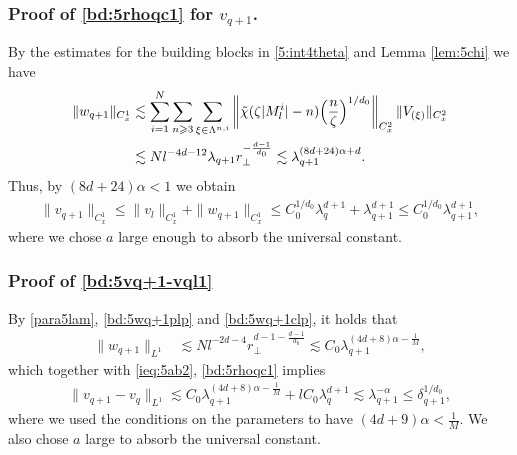 \documentclass[UTF-8,reqno]{amsart}
\numberwithin{equation}{section}
\theoremstyle{definition}
\def\({{\Big(}}
\def\){{\Big)}}
\newcommand{\norm}[1]{\left\|#1\right\|}
\def\geq{\geqslant}
\def\leq{\leqslant}
\def\({{\Big(}}
\def\){{\Big)}}
\def\geq{\geqslant}
\def\leq{\leqslant}
\begin{document}
\subsubsection{Proof of  \eqref{bd:5rhoqc1} for $v_{q+1}$.}
 By the estimates for the building blocks in \eqref{5:int4theta} and   Lemma \ref{lem:5chi} we have 
\begin{align}
\|w_{q+1}\|_{C_{x}^1}&\lesssim \sum_{i=1}^N\sum_{n\geq3}\sum_{\xi\in\Lambda^{n,i}}\norm{\tilde{\chi}(\zeta |M^i_l|-n)\(\frac{n}{\zeta }\)^{1/d_0}}_{C_{x}^{2}}\|  V_{ (\xi)}\|_{C_{x}^2}\notag\\
&\lesssim  Nl^{-4d-12}\lambda_{q+1} r_\perp^{-\frac{d-1}{d_0}}\lesssim \lambda_{q+1}^{(8d+24)\alpha+d }.\notag
\end{align}
 Thus, by $(8d+24)\alpha<1$ we obtain
 \begin{align*}
\|v_{q+1}\|_ {C_{x}^1}\leq\|v_{l}\|_ {C_{x}^1}+\|w_{q+1}\|_ {C_{x}^1}\leq C_0^{1/d_0}\lambda_{q}^{d+1}+ \lambda_{q+1}^{d+1}\leq C_0^{1/d_0}\lambda_{q+1}^{ d+1},
 \end{align*} where we chose $a$ large enough to absorb the universal constant. 

\subsubsection{Proof of \eqref{bd:5vq+1-vql1}}By \eqref{para5lam}, \eqref{bd:5wq+1plp} and \eqref{bd:5wq+1clp}, it holds that
\begin{align*}
\|w_{q+1}\|_{L^1}&\lesssim  Nl^{-2d-4}r_\perp^{{d-1}-\frac{d-1}{d_0}} \lesssim C_0\lambda_{q+1}^{(4d+8)\alpha-\frac{1}{M}},
\end{align*} 
which together with   \eqref{ieq:5ab2}, \eqref{bd:5rhoqc1} implies 
\begin{align*}
     \|v_{q+1}-v_{q}\|_{L^{1}}\lesssim
 C_0\lambda_{q+1}^{(4d+8)\alpha-\frac{1}{M}}+lC_0\lambda_q^{d+1}\lesssim \lambda_{q+1}^{-\alpha}\leq  \delta_{q+1}^{1/d_0},
\end{align*}
where we used the   conditions on the parameters to have $(4d+9)\alpha<\frac{1}{M} $. We also chose $a$ large to absorb the universal constant.
\end{document}
